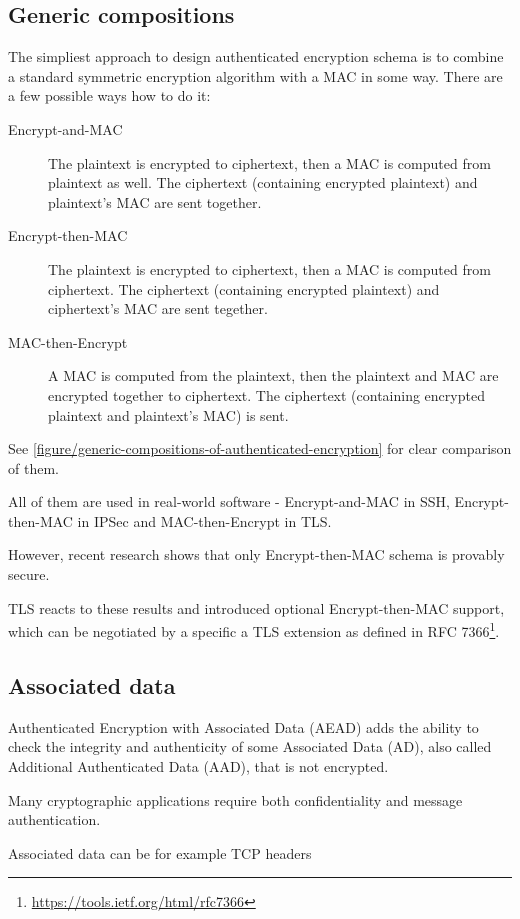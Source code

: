 \subsection{Generic compositions}

The simpliest approach to design authenticated encryption schema is to combine a standard symmetric encryption algorithm with a MAC in some way. There are a few possible ways how to do it:

\begin{description}
  \item[Encrypt-and-MAC] The plaintext is encrypted to ciphertext, then a MAC is computed from plaintext as well. The ciphertext (containing encrypted plaintext) and plaintext's MAC are sent together.
  \item[Encrypt-then-MAC] The plaintext is encrypted to ciphertext, then a MAC is computed from ciphertext. The ciphertext (containing encrypted plaintext) and ciphertext's MAC are sent tegether.
  \item[MAC-then-Encrypt] A MAC is computed from the plaintext, then the plaintext and MAC are encrypted together to ciphertext. The ciphertext (containing encrypted plaintext and plaintext's MAC) is sent.
\end{description}

See \autoref{figure/generic-compositions-of-authenticated-encryption} for clear comparison of them.

All of them are used in real-world software - Encrypt-and-MAC in SSH, Encrypt-then-MAC in IPSec and MAC-then-Encrypt in TLS.

However, recent research shows that only Encrypt-then-MAC schema is provably secure. \cite{generic-ae} \cite{generic-ae2}

TLS reacts to these results and introduced optional Encrypt-then-MAC support, which can be negotiated by a specific a TLS extension as defined in RFC 7366\footnote{\url{https://tools.ietf.org/html/rfc7366}}.



\subsection{Associated data}

Authenticated Encryption with Associated Data (AEAD) adds the ability to check the integrity and authenticity of some Associated Data (AD), also called Additional Authenticated Data (AAD), that is not encrypted.

Many cryptographic applications require both confidentiality and message authentication.

Associated data can be for example TCP headers

